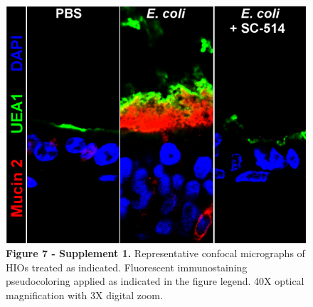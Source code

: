 \documentclass[9pt,lineo]{elife}
\date{\today}
\title{}
\begin{document}
\begin{figure}
  \begin{fullwidth} \centering\includegraphics[width=0.9\linewidth]{./figures/figure7/Supplemental_Figure4_Muc2-NFkB.pdf}
\caption*{\textbf{Figure 7 - Supplement 1. }Representative confocal micrographs of HIOs treated as indicated. Fluorescent immunostaining pseudocoloring applied as indicated in the figure legend. 40X optical magnification with 3X digital zoom.}
\label{fig:fullwidth}
\end{fullwidth}
\end{figure}
\end{document}

